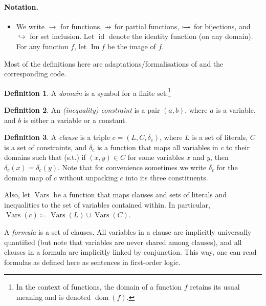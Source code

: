\documentclass{article}
\theoremstyle{definition}
\newtheorem{definition}{Definition}
\theoremstyle{remark}
\newcommand\pfun{\mathrel{\ooalign{\hfil$\mapstochar\mkern5mu$\hfil\cr$\to$\cr}}}
\newcommand*{\twoheadrightarrowtail}{\mathrel{\rightarrowtail\kern-1.9ex\twoheadrightarrow}}
\DeclareMathOperator{\dom}{dom}
\DeclareMathOperator{\id}{id}
\DeclareMathOperator{\Imm}{Im}
\DeclareMathOperator{\Vars}{Vars}
\begin{document}
\paragraph{Notation.}
\begin{itemize}
\item We write $\to$ for functions, $\pfun$ for partial functions, $\twoheadrightarrowtail$ for bijections, and $\hookrightarrow$ for set inclusion. Let $\id$ denote the identity function (on any domain). For any function $f$, let $\Imm f$ be the image of $f$.
\end{itemize}

Most of the definitions here are adaptations/formalisations of \cite{DBLP:conf/ijcai/BroeckTMDR11} and the corresponding code.

\begin{definition}
  A \emph{domain} is a symbol for a finite set.\footnote{In the context of functions, the domain of a function $f$ retains its usual meaning and is denoted $\dom(f)$.}
\end{definition}

\begin{definition}
  An \emph{(inequality) constraint} is a pair $(a, b)$, where $a$ is a variable, and $b$ is either a variable or a constant.
\end{definition}

\begin{definition}
  A \emph{clause} is a triple $c = (L, C, \delta_c)$, where $L$ is a set of literals, $C$ is a set of constraints, and $\delta_c$ is a function that maps all variables in $c$ to their domains such that (s.t.) if $(x, y) \in C$ for some variables $x$ and $y$, then $\delta_c(x) = \delta_c(y)$. Note that for convenience sometimes we write $\delta_c$ for the domain map of $c$ without unpacking $c$ into its three constituents.

  Also, let $\Vars$ be a function that maps clauses and sets of literals and inequalities to the set of variables contained within. In particular, $\Vars(c) \coloneqq \Vars(L) \cup \Vars(C)$.
\end{definition}

A \emph{formula} is a set of clauses. All variables in a clause are implicitly universally quantified (but note that variables are never shared among clauses), and all clauses in a formula are implicitly linked by conjunction. This way, one can read formulas as defined here as sentences in first-order logic.
\end{document}
